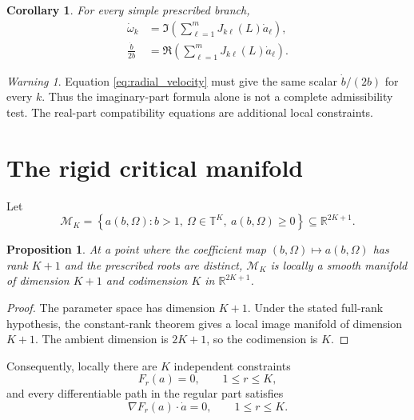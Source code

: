 \documentclass[11pt]{amsart}
\numberwithin{equation}{section}
\theoremstyle{plain}
\newtheorem{proposition}[theorem]{Proposition}
\newtheorem{corollary}[theorem]{Corollary}
\theoremstyle{definition}
\theoremstyle{remark}
\newtheorem{warning}[theorem]{Warning}
\begin{document}
\begin{corollary}
\label{cor:phase_and_radius_velocity}
For every simple prescribed branch,
\begin{align}
\dot\omega_k
&=
\Im\left(
\sum_{\ell=1}^{m}J_{k\ell}(L)\dot a_\ell
\right),
\label{eq:angular_velocity}\\
\frac{\dot b}{2b}
&=
\Re\left(
\sum_{\ell=1}^{m}J_{k\ell}(L)\dot a_\ell
\right).
\label{eq:radial_velocity}
\end{align}
\end{corollary}

\begin{warning}
\label{warn:radial_compatibility}
Equation \eqref{eq:radial_velocity} must give the same scalar $\dot b/(2b)$ for every $k$.  Thus the imaginary-part formula alone is not a complete admissibility test.  The real-part compatibility equations are additional local constraints.
\end{warning}

\section{The rigid critical manifold}
\label{sec:critical_manifold}

Let
\begin{equation}
\mathcal M_K
=
\left\{
a(b,\Omega):
 b>1,\ \Omega\in\mathbb T^K,
\ a(b,\Omega)\geq0
\right\}
\subseteq\mathbb R^{2K+1}.
\label{eq:rigid_critical_set}
\end{equation}

\begin{proposition}
\label{prop:generic_dimension}
At a point where the coefficient map $(b,\Omega)\mapsto a(b,\Omega)$ has rank $K+1$ and the prescribed roots are distinct, $\mathcal M_K$ is locally a smooth manifold of dimension $K+1$ and codimension $K$ in $\mathbb R^{2K+1}$.
\end{proposition}

\begin{proof}
The parameter space has dimension $K+1$.  Under the stated full-rank hypothesis, the constant-rank theorem gives a local image manifold of dimension $K+1$.  The ambient dimension is $2K+1$, so the codimension is $K$.
\end{proof}

Consequently, locally there are $K$ independent constraints
\begin{equation}
F_r(a)=0,
\qquad 1\leq r\leq K,
\label{eq:implicit_constraints}
\end{equation}
and every differentiable path in the regular part satisfies
\begin{equation}
\nabla F_r(a)\cdot\dot a=0,
\qquad 1\leq r\leq K.
\label{eq:tangent_equalities}
\end{equation}
\end{document}

